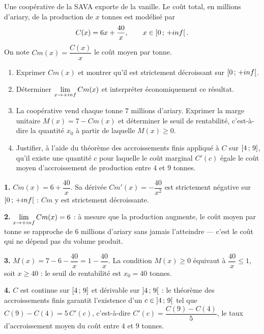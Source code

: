 \begin{jecherche}
Une coopérative de la SAVA exporte de la vanille. Le coût total, en millions
d'ariary, de la production de $x$ tonnes est modélisé par
\[
  C(x) = 6x + \frac{40}{x}, \qquad x \in \left[0\,;\,+inf\right[.
\]
On note $Cm(x) = \dfrac{C(x)}{x}$ le coût moyen par tonne.

\begin{enumerate}[label=\textbf{\arabic*.}, leftmargin=*, itemsep=0.3em]
  \item Exprimer $Cm(x)$ et montrer qu'il est strictement décroissant sur
        $\left[0\,;\,+inf\right[$.
  \item Déterminer $\limpinf Cm(x)$ et interpréter économiquement ce résultat.
  \item La coopérative vend chaque tonne $7$ millions d'ariary. Exprimer la
        marge unitaire $M(x) = 7-Cm(x)$ et déterminer le seuil de
        rentabilité, c'est-à-dire la quantité $x_{0}$ à partir de laquelle
        $M(x) \geq 0$.
  \item Justifier, à l'aide du théorème des accroissements finis appliqué à
        $C$ sur $\left[4\,;\,9\right]$, qu'il existe une quantité $c$ pour
        laquelle le coût marginal $C'(c)$ égale le coût moyen d'accroissement
        de production entre $4$ et $9$ tonnes.
\end{enumerate}
\end{jecherche}

\begin{corrige}
\textbf{1.} $Cm(x) = 6 + \dfrac{40}{x}$. Sa dérivée
$Cm'(x) = -\dfrac{40}{x^{2}}$ est strictement négative sur
$\left[0\,;\,+inf\right[$ : $Cm$ y est strictement décroissante.

\textbf{2.} $\limpinf Cm(x) = 6$ : à mesure que la production augmente, le
coût moyen par tonne se rapproche de $6$ millions d'ariary sans jamais
l'atteindre — c'est le coût qui ne dépend pas du volume produit.

\textbf{3.} $M(x) = 7-6-\dfrac{40}{x} = 1-\dfrac{40}{x}$. La condition
$M(x) \geq 0$ équivaut à $\dfrac{40}{x} \leq 1$, soit $x \geq 40$ : le seuil
de rentabilité est $x_{0} = 40$ tonnes.

\textbf{4.} $C$ est continue sur $\left[4\,;\,9\right]$ et dérivable sur
$\left]4\,;\,9\right[$ : le théorème des accroissements finis garantit
l'existence d'un $c \in \left]4\,;\,9\right[$ tel que
$C(9)-C(4) = 5\,C'(c)$, c'est-à-dire $C'(c) = \dfrac{C(9)-C(4)}{5}$, le taux
d'accroissement moyen du coût entre $4$ et $9$ tonnes.
\end{corrige}

